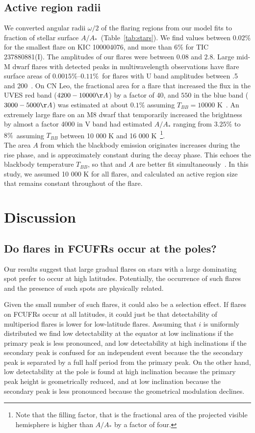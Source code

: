 \documentclass[fleqn,usenatbib,letters]{mnras}%
\newcommand{\FC}{TIC 237880881} %
\newcommand{\FE}{KIC 100004076} %
\begin{document}
\subsection{Active region radii}
We converted angular radii $\omega/2$ of the flaring regions from our model fits to fraction of stellar surface $A/A_*$~(Table~\ref{tab:stars}). We find values between $0.02\%$ for the smallest flare on \FE, and more than $6\%$ for \FC (I). The amplitudes of our flares were between $0.08$ and $2.8$. Large mid-M dwarf flares with detected peaks in multiwavelength observations have flare surface areas of $0.0015\%–0.11\%$~for flares with U band amplitudes between .5 and 200~\citep{kowalski2013}. On CN Leo, the fractional area for a flare that increased the flux in the UVES red band ($4200-10000\AA$) by a factor of 40, and $550$ in the blue band ($3000-5000\AA$) was estimated at about $0.1\%$ assuming $T_{BB}=10 000$ K~\citep{fuhrmeister2008}. An extremely large flare on an M8 dwarf that temporarily increased the brightness by almost a factor 4000 in V band had estimated $A/A_*$ ranging from $3.25\%$ to $8\%$~assuming $T_{BB}$ between 10 000 K and 16 000 K~\citep{schmidt2014}\footnote{Note that the filling factor, that is the fractional area of the projected visible hemisphere is higher than $A/A_*$ by a factor of four.}.
\\
The area $A$ from which the blackbody emission originates increases during the rise phase, and is approximately constant during the decay phase. This echoes the blackbody temperature $T_{BB}$, so that and $A$ are better fit simultaneously~\citep{kowalski2013}. In this study, we assumed 10 000 K for all flares, and calculated an active region size that remains constant throughout of the flare.
\section{Discussion}
\label{sec:discussion}

\subsection{Do flares in FCUFRs occur at the poles?}
Our results suggest that large gradual flares on stars with a large dominating spot prefer to occur at high latitudes. Potentially, the occurrence of such flares and the presence of such spots are physically related.

Given the small number of such flares, it could also be a selection effect. If flares on FCUFRs occur at all latitudes, it could just be that detectability of multiperiod flares is lower for low-latitude flares. Assuming that $i$ is uniformly distributed we find low detectability at the equator at low inclinations if the primary peak is less pronounced, and low detectability at high inclinations if the secondary peak is confused for an independent event because the the secondary peak is separated by a full half period from the primary peak. On the other hand, low detectability at the pole is found at high inclination because the primary peak height is geometrically reduced, and at low inclination because the secondary peak is less pronounced because the geometrical modulation declines.
\end{document}
